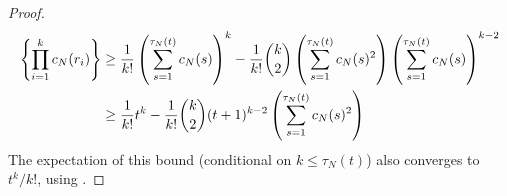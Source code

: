 \documentclass{article}
\newcommand{\E}{\mathbb{E}}
\newcommand{\1}[1]{\mathbbm{1}_{#1}}
\begin{document}
\begin{proof}
\begin{align}
\left\{ \prod_{i=1}^k c_N(r_i) \right\} 
&\geq \frac{1}{k!} \left( \sum_{s=1}^{\tau_N(t)} c_N(s) \right)^k
- \frac{1}{k!} \binom{k}{2}  \left( \sum_{s=1}^{\tau_N(t)} c_N(s)^2 \right)  \left( \sum_{s=1}^{\tau_N(t)} c_N(s) \right)^{k-2} \notag\\
&\geq \frac{1}{k!} t^k - \frac{1}{k!} \binom{k}{2} (t+1)^{k-2}  \left( \sum_{s=1}^{\tau_N(t)} c_N(s)^2 \right)
\end{align}
The expectation of this bound (conditional on $k\leq\tau_N(t)$) also converges to $t^k/k!$, using \citet[Equation (5)]{brown2020}.

\end{proof}
\end{document}

